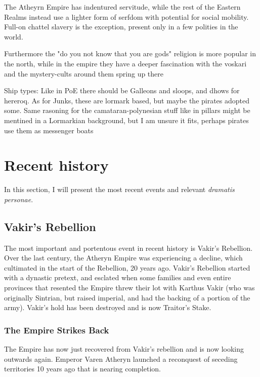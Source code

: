 The Atheyrn Empire has indentured servitude, while the rest of the Eastern Realms instead use a lighter form of serfdom with potential for social mobility. Full-on chattel slavery is the exception, present only in a few polities in the world.

Furthermore the "do you not know that you are gods" religion is more popular in the north, while in the empire they have a deeper fascination with the voskari and the mystery-cults around them spring up there




Ship types:
	Like in PoE there should be Galleons and sloops, and dhows for hereroq.
	As for Junks, these are lormark based, but maybe the pirates adopted some. Same rasoning for the camataran-polynesian stuff like in pillars might be mentined in a Lormarkian background, but I am unsure it fits, perhaps pirates use them as messenger boats





\section{Recent history}

\label{recent_history}

In this section, I will present the most recent events and relevant \textit{dramatis personae}.

\subsection{Vakir's Rebellion}

The most important and portentous event in recent history is Vakir's Rebellion. Over the last century, the Atheryn Empire was experiencing a decline, which cultimated in the start of the Rebellion, 20 years ago. Vakir's Rebellion started with a dynastic pretext, and esclated when some families and even entire provinces that resented the Empire threw their lot with Karthus Vakir (who was originally Sintrian, but raised imperial, and had the backing of a portion of the army). Vakir's hold has been destroyed and is now Traitor's Stake.


\subsubsection{The Empire Strikes Back}

The Empire has now just recovered from Vakir's rebellion and is now looking outwards again. Emperor Varen Atheryn launched a reconquest of seceding territories 10 years ago that is nearing completion.

